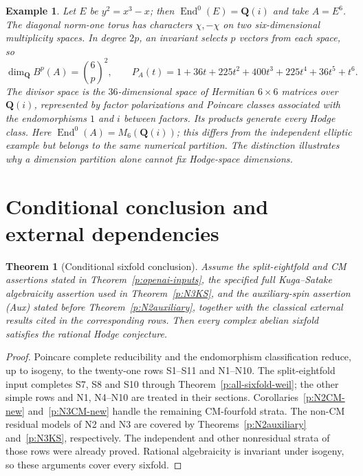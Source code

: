 \documentclass[11pt,reqno]{article}
\theoremstyle{emphasizedplain}
\theoremstyle{emphasizeddefinition}
\newtheorem{example}[theorem]{Example}
\theoremstyle{emphasizeddefinition}
\newtheorem{pretheorem}[prelemma]{Theorem}
\DeclareMathOperator{\End}{End}
\newcommand{\Q}{\mathbf Q}
\newcommand{\B}{B}
\begin{document}
\begin{example}
Let $E$ be $y^2=x^3-x$; then $\End^0(E)=\Q(i)$ and take $A=E^6$.
The diagonal norm-one torus has characters $\chi,-\chi$ on two
six-dimensional multiplicity spaces. In degree $2p$, an invariant selects
$p$ vectors from each space, so
\[
 \dim_\Q\B^p(A)=\binom6p^2,\qquad
 P_A(t)=1+36t+225t^2+400t^3+225t^4+36t^5+t^6.
\]
The divisor space is the $36$-dimensional space of Hermitian $6\times6$
matrices over $\Q(i)$, represented by factor polarizations and Poincare
classes associated with the endomorphisms $1$ and $i$ between factors.
Its products generate every Hodge class. Here
$\End^0(A)=M_6(\Q(i))$; this differs from the independent elliptic example
but belongs to the same numerical partition. The distinction illustrates
why a dimension partition alone cannot fix Hodge-space dimensions.
\end{example}

\section*{Conditional conclusion and external dependencies}
\begin{pretheorem}[Conditional sixfold conclusion]
\label{p:conditional-sixfold}
Assume the split-eightfold and CM assertions stated in
Theorem~\ref{p:openai-inputs}, the specified full Kuga--Satake
algebraicity assertion used in Theorem~\ref{p:N3KS}, and the
auxiliary-spin assertion (Aux) stated before
Theorem~\ref{p:N2auxiliary}, together with the classical external
results cited in the corresponding rows. Then every complex
abelian sixfold satisfies the rational Hodge conjecture.
\end{pretheorem}
\begin{proof}
Poincare complete reducibility and the endomorphism classification
reduce, up to isogeny, to the twenty-one rows S1--S11 and N1--N10.
The split-eightfold input completes S7, S8 and S10 through
Theorem~\ref{p:all-sixfold-weil}; the other simple rows and N1,
N4--N10 are treated in their sections.
Corollaries~\ref{p:N2CM-new} and~\ref{p:N3CM-new} handle the
remaining CM-fourfold strata. The non-CM residual models of
N2 and N3 are covered by Theorems~\ref{p:N2auxiliary}
and~\ref{p:N3KS}, respectively. The independent and other
nonresidual strata of those rows were already proved.
Rational algebraicity is invariant under isogeny, so these
arguments cover every sixfold.
\end{proof}
\end{document}
